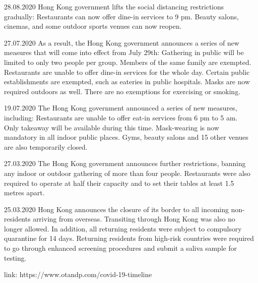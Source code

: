 28.08.2020 Hong Kong government lifts the social distancing restrictions gradually:
Restaurants can now offer dine-in services to 9 pm.
Beauty salons, cinemas, and some outdoor sports venues can now reopen.

27.07.2020 As a result, the Hong Kong government announces a series of new measures that will come into effect from July 29th:
Gathering in public will be limited to only two people per group. Members of the same family are exempted.
Restaurants are unable to offer dine-in services for the whole day. Certain public establishments are exempted, such as eateries in public hospitals.
Masks are now required outdoors as well. There are no exemptions for exercising or smoking.

19.07.2020 The Hong Kong government announced a series of new measures, including:
Restaurants are unable to offer eat-in services from 6 pm to 5 am. Only takeaway will be available during this time. Mask-wearing is now mandatory in all indoor public places.
Gyms, beauty salons and 15 other venues are also temporarily closed.

27.03.2020 The Hong Kong government announces further restrictions, banning any indoor or outdoor gathering of more than four people. Restaurants were also required to operate at half their capacity and to set their tables at least 1.5 metres apart.

25.03.2020 Hong Kong announces the closure of its border to all incoming non-residents arriving from overseas. Transiting through Hong Kong was also no longer allowed. In addition, all returning residents were subject to compulsory quarantine for 14 days. Returning residents from high-risk countries were required to go through enhanced screening procedures and submit a saliva sample for testing.

link: https://www.otandp.com/covid-19-timeline










